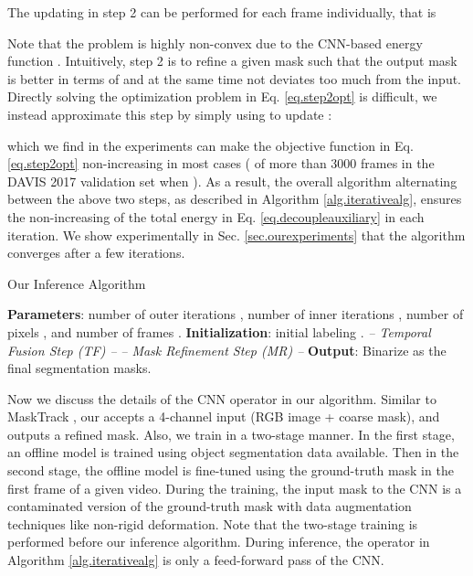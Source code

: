 \documentclass[10pt,twocolumn,letterpaper]{article}
\begin{document}
The updating in step 2 can be performed for each frame  individually, that is

Note that the problem is highly non-convex due to the CNN-based energy function .
Intuitively, step 2 is to refine a given mask  such that the output mask  is better
in terms of  and at the same time not deviates too much from the input.
Directly solving the optimization problem in Eq. \eqref{eq.step2opt} is difficult,
we instead approximate this step by simply using  to update :

which we find in the experiments can make the objective function in Eq. \eqref{eq.step2opt} non-increasing in most cases
( of more than 3000 frames in the DAVIS 2017 validation set when ).
As a result, the overall algorithm alternating between the above two steps, as described in Algorithm \ref{alg.iterativealg},
ensures the non-increasing of the total energy in Eq. \eqref{eq.decoupleauxiliary} in each iteration.
We show experimentally in Sec. \ref{sec.ourexperiments} that the algorithm converges after a few iterations.













\begin{algorithm}[t!]
\caption{Our Inference Algorithm}
\begin{algorithmic}\STATE \textbf{Parameters}: number of outer iterations , number of inner iterations , number of pixels , and number of frames .
\STATE \textbf{Initialization}: initial labeling .
    \STATE \emph{-- Temporal Fusion Step (TF) --}
    \STATE 
            \STATE 
            \STATE \quad\quad\quad\quad\quad\quad 
\ENDFOR
    \ENDFOR
    \STATE 
    \STATE \emph{-- Mask Refinement Step (MR) --}
        \STATE 
\ENDFOR
\ENDFOR
\STATE \textbf{Output}: Binarize  as the final segmentation masks.
\end{algorithmic}
\label{alg.iterativealg}
\end{algorithm}


Now we discuss the details of the CNN operator  in our algorithm.
Similar to MaskTrack \cite{perazzi2017learning}, our  accepts a 4-channel input (RGB image + coarse mask),
and outputs a refined mask.
Also, we train  in a two-stage manner.
In the first stage, an offline model is trained using object segmentation data available.
Then in the second stage, the offline model is fine-tuned using the ground-truth mask in the first frame of a given video.
During the training, the input mask to the CNN is a contaminated version of the ground-truth mask
with data augmentation techniques like non-rigid deformation.
Note that the two-stage training is performed before our inference algorithm.
During inference, the operator  in Algorithm \ref{alg.iterativealg} is only a feed-forward pass of the CNN.
\end{document}
